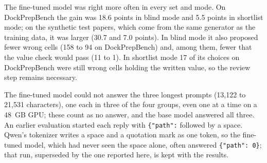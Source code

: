 \documentclass[11pt]{article}
\begin{document}
The fine-tuned model was right more often in every set and mode. On DockPrepBench the gain was
18.6 points in blind mode and 5.5 points in shortlist mode; on the synthetic test papers, which
come from the same generator as the training data, it was larger (30.7 and 7.0 points). In blind
mode it also proposed fewer wrong cells (158 to 94 on DockPrepBench) and, among them, fewer that
the value check would pass (11 to 1). In shortlist mode 17 of its choices on DockPrepBench were
still wrong cells holding the written value, so the review step remains necessary.

The fine-tuned model could not answer the three longest prompts (13,122 to 21,531 characters),
one each in three of the four groups, even one at a time on a 48~GB GPU; these count as no
answer, and the base model answered all three. An earlier evaluation started each reply with
\texttt{\{"path":} followed by a space. Qwen's tokenizer writes a space and a quotation mark as
one token, so the fine-tuned model, which had never seen the space alone, often answered
\texttt{\{"path": 0\}}; that run, superseded by the one reported here, is kept with the results.
\end{document}
